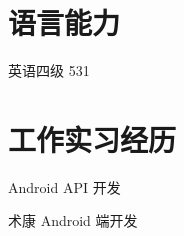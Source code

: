 \documentclass[]{deedy-resume-openfont}
\begin{document}
\begin{minipage}[t]{0.3\textwidth}
\section{语言能力}
\sectionsep
英语四级 531 \\
\sectionsep



%
%



\section{工作实习经历}

\sectionsep
{}
\vspace{\topsep}
\vspace{\topsep}
\begin{tightemize}
\item Android API 开发
\end{tightemize}
\sectionsep

\sectionsep
{}
\vspace{\topsep}
\begin{tightemize}
\item 术康 Android 端开发
\end{tightemize}
\sectionsep


\end{minipage}
\end{document}
